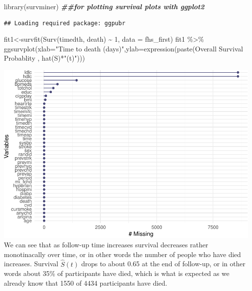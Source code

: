 \documentclass[
]{book}
\newenvironment{Shaded}{\begin{snugshade}}{\end{snugshade}}
\newcommand{\AttributeTok}[1]{\textcolor[rgb]{0.77,0.63,0.00}{#1}}
\newcommand{\DecValTok}[1]{\textcolor[rgb]{0.00,0.00,0.81}{#1}}
\newcommand{\DocumentationTok}[1]{\textcolor[rgb]{0.56,0.35,0.01}{\textbf{\textit{#1}}}}
\newcommand{\FunctionTok}[1]{\textcolor[rgb]{0.00,0.00,0.00}{#1}}
\newcommand{\NormalTok}[1]{#1}
\newcommand{\OtherTok}[1]{\textcolor[rgb]{0.56,0.35,0.01}{#1}}
\newcommand{\SpecialCharTok}[1]{\textcolor[rgb]{0.00,0.00,0.00}{#1}}
\newcommand{\StringTok}[1]{\textcolor[rgb]{0.31,0.60,0.02}{#1}}
\begin{document}
\begin{Shaded}
\begin{Highlighting}[]
\FunctionTok{library}\NormalTok{(survminer) }\DocumentationTok{\#\#for plotting survival plots with ggplot2}
\end{Highlighting}
\end{Shaded}

\begin{verbatim}
## Loading required package: ggpubr
\end{verbatim}

\begin{Shaded}
\begin{Highlighting}[]
\NormalTok{fit1}\OtherTok{\textless{}{-}}\FunctionTok{survfit}\NormalTok{(}\FunctionTok{Surv}\NormalTok{(timedth, death) }\SpecialCharTok{\textasciitilde{}} \DecValTok{1}\NormalTok{, }\AttributeTok{data =}\NormalTok{ fhs\_first)}
\NormalTok{fit1 }\SpecialCharTok{\%\textgreater{}\%}
\FunctionTok{ggsurvplot}\NormalTok{(}\AttributeTok{xlab=}\StringTok{"Time to death (days)"}\NormalTok{,}\AttributeTok{ylab=}\FunctionTok{expression}\NormalTok{(}\FunctionTok{paste}\NormalTok{(}\StringTok{\textquotesingle{}Overall Survival Probablity \textquotesingle{}}\NormalTok{, }\FunctionTok{hat}\NormalTok{(S)}\SpecialCharTok{*}\StringTok{"(t)"}\NormalTok{)))}
\end{Highlighting}
\end{Shaded}

\includegraphics{adv_epi_analysis_files/figure-latex/unnamed-chunk-97-1.pdf}
We can see that as follow-up time increases survival decreases rather monotinacally over time, or in other words the number of people who have died increases. Survival \(\hat{S}(t)\) drops to about 0.65 at the end of follow-up, or in other words about 35\% of participants have died, which is what is expected as we already know that 1550 of 4434 participants have died.
\end{document}
